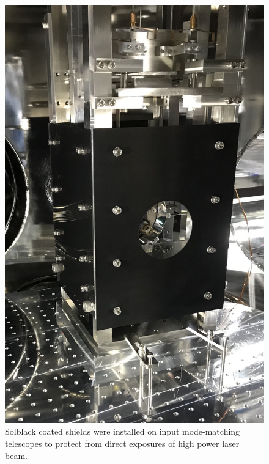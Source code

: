 \begin{figure}[t]
\begin{center}
\includegraphics[scale=0.15]{astrodiv/gw/ioo/shield.jpeg}
\caption{Solblack coated shields were installed on input mode-matching telescopes
to protect from direct exposures of high power laser beam.}
\label{fig:shield}
\end{center}
\end{figure}


